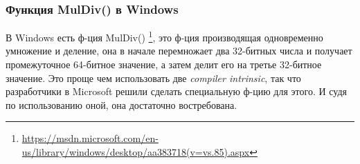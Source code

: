 \subsubsection{Функция MulDiv() в Windows}

В Windows есть ф-ция MulDiv()
\footnote{\url{https://msdn.microsoft.com/en-us/library/windows/desktop/aa383718(v=vs.85).aspx}},
это ф-ция производящая одновременно умножение и деление, она в начале перемножает два 32-битных числа и получает
промежуточное 64-битное значение, а затем делит его на третье 32-битное значение.
Это проще чем использовать две \emph{compiler intrinsic}, так что разработчики в Microsoft решили сделать специальную ф-цию
для этого.
И судя по использованию оной, она достаточно востребована.

